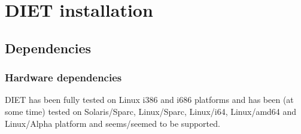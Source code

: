 
\chapter{DIET installation}
\label{ch:installing}

\section{Dependencies}
\label{sec:dependencies}

\subsection{Hardware dependencies}

DIET has been fully tested on Linux i386 and i686 platforms and has 
been (at some time) tested on Solaris/Sparc, Linux/Sparc, Linux/i64,
Linux/amd64 and Linux/Alpha platform and seems/seemed to be supported.

